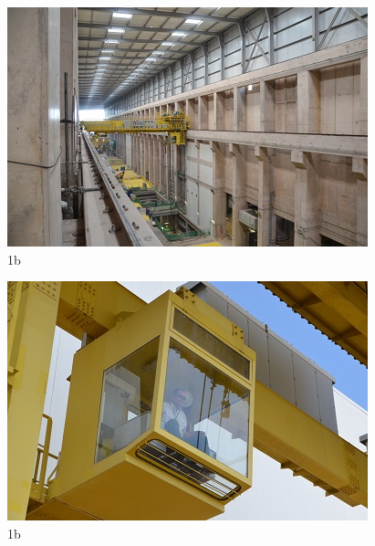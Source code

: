 \begin{figure}[h!]
  \centering
  \includegraphics[width=1\linewidth]{Fotos/Novembro2014/9.jpg}
  \caption{1b}
  \label{nov20136}
\end{figure}

\begin{figure}[h!]
  \centering
  \includegraphics[width=1\linewidth]{Fotos/Novembro2014/10.jpg}
  \caption{1b}
  \label{nov20136}
\end{figure}

